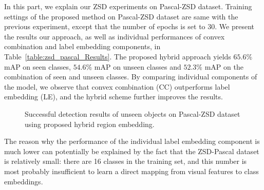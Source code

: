 In this part, we explain our ZSD experiments on Pascal-ZSD dataset. Training settings of the proposed method on
Pascal-ZSD dataset are same with the previous experiment, except that the number of epochs is set to 30. 
We present the results our approach, as well as individual performances of convex combination and label embedding components,
in Table~\ref{table:zsd_pascal_Results}. The proposed hybrid approach yields $65.6\%$ mAP on seen
classes, $54.6\%$ mAP on unseen classes and $52.3\%$ mAP on the combination of 
seen and unseen classes. By comparing individual components of the model, we observe that 
convex combination (CC) outperforms label embedding (LE), and the hybrid scheme further improves the results.

\vspace{4mm}

\begin{figure}
\caption{Successful detection results of unseen objects on Pascal-ZSD dataset using proposed hybrid region embedding.}
\label{fig:pascal_results}
\end{figure}

The reason why the performance of the individual label embedding component is much lower can potentially be explained by the
fact that the ZSD-Pascal dataset is relatively small: there are 16 classes in the training set, and this number is
most probably insufficient to learn a direct mapping from visual features to class embeddings.

